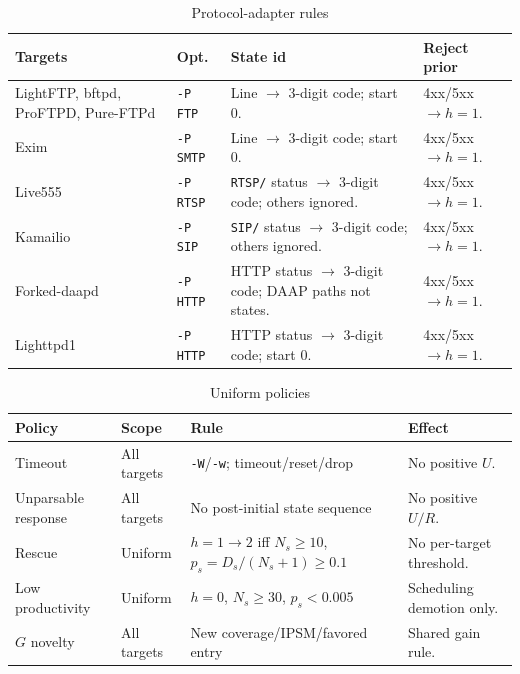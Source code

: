 \documentclass[final,5p,times,number]{elsarticle}
\begin{document}
\begin{table}[!t]
\centering
\caption{Protocol-adapter rules}
\label{tab:protocol_adapter_rules}
{\scriptsize
\setlength{\tabcolsep}{3.2pt}
\renewcommand{\arraystretch}{1.08}
\begin{tabularx}{\textwidth}{>{\raggedright\arraybackslash}p{}
>{\raggedright\arraybackslash}p{}
>{\raggedright\arraybackslash}X
>{\raggedright\arraybackslash}p{}}
\toprule
Targets & Opt. & State id & Reject prior \\
\midrule
LightFTP, bftpd, ProFTPD, Pure-FTPd &
\texttt{-P FTP} &
Line $\rightarrow$ 3-digit code; start 0. &
4xx/5xx $\rightarrow h=1$. \\
Exim &
\texttt{-P SMTP} &
Line $\rightarrow$ 3-digit code; start 0. &
4xx/5xx $\rightarrow h=1$. \\
Live555 &
\texttt{-P RTSP} &
\texttt{RTSP/} status $\rightarrow$ 3-digit code; others ignored. &
4xx/5xx $\rightarrow h=1$. \\
Kamailio &
\texttt{-P SIP} &
\texttt{SIP/} status $\rightarrow$ 3-digit code; others ignored. &
4xx/5xx $\rightarrow h=1$. \\
Forked-daapd &
\texttt{-P HTTP} &
HTTP status $\rightarrow$ 3-digit code; DAAP paths not states. &
4xx/5xx $\rightarrow h=1$. \\
Lighttpd1 &
\texttt{-P HTTP} &
HTTP status $\rightarrow$ 3-digit code; start 0. &
4xx/5xx $\rightarrow h=1$. \\
\bottomrule
\end{tabularx}
}
\end{table}

\begin{table}[!t]
\centering
\caption{Uniform policies}
\label{tab:uniform_policies}
{\scriptsize
\setlength{\tabcolsep}{3.2pt}
\renewcommand{\arraystretch}{1.08}
\begin{tabularx}{\textwidth}{>{\raggedright\arraybackslash}p{}
>{\raggedright\arraybackslash}p{}
>{\raggedright\arraybackslash}X
>{\raggedright\arraybackslash}p{}}
\toprule
Policy & Scope & Rule & Effect \\
\midrule
Timeout &
All targets &
\texttt{-W}/\texttt{-w}; timeout/reset/drop &
No positive $U$. \\
Unparsable response &
All targets &
No post-initial state sequence &
No positive $U/R$. \\
Rescue &
Uniform &
$h=1\!\rightarrow\!2$ iff $N_s\ge10$, $p_s=D_s/(N_s+1)\ge0.1$ &
No per-target threshold. \\
Low productivity &
Uniform &
$h=0$, $N_s\ge30$, $p_s<0.005$ &
Scheduling demotion only. \\
$G$ novelty &
All targets &
New coverage/IPSM/favored entry &
Shared gain rule. \\
\bottomrule
\end{tabularx}
}
\end{table}
\end{document}
